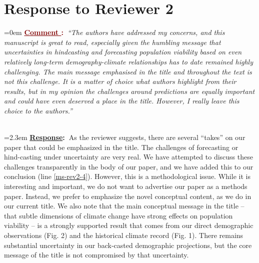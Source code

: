 \documentclass[12pt]{article}
\newcounter{cN}
\newcommand{\comment}[1]{
	\vspace{2em}
	\refstepcounter{cN} %
	\noindent \hangindent=0em \textbf{\textcolor{Maroon}{\uline{Comment \thecN}:~}}\emph{``#1''}
	}
\newcommand{\response}[1]{
	\\[0.25em]
	\hangindent=2.3em \textbf{\textcolor{NavyBlue}{\uline{Response}:~}}#1
	}
\begin{document}
\section{Response to Reviewer 2}
\vspace{-2em}

\comment{The authors have addressed my concerns, and this manuscript is great to read, especially given the humbling message that uncertainties in hindcasting and forecasting population viability based on even relatively long-term demography-climate relationships has to date remained highly challenging. The main message emphasised in the title and throughout the text is not this challenge. It is a matter of choice what authors highlight from their results, but in my opinion the challenges around predictions are equally important and could have even deserved a place in the title. However, I really leave this choice to the authors.}
\response{As the reviewer suggests, there are several ``takes'' on our paper that could be emphasized in the title.
The challenges of forecasting or hind-casting under uncertainty are very real.
We have attempted to discuss these challenges transparently in the body of our paper, and we have added this to our conclusion (line \ref{ms-rev2-4}). 
However, this is a methodological issue.
While it is interesting and important, we do not want to advertise our paper as a methods paper. 
Instead, we prefer to emphasize the novel conceptual content, as we do in our current title. 
We also note that the main conceptual message in the title -- that subtle dimensions of climate change have strong effects on population viability -- is a strongly supported result that comes from our direct demographic observations (Fig. 2) and the historical climate record (Fig. 1).
There remains substantial uncertainty in our back-casted demographic projections, but the core message of the title is not compromised by that uncertainty.}
\end{document}
